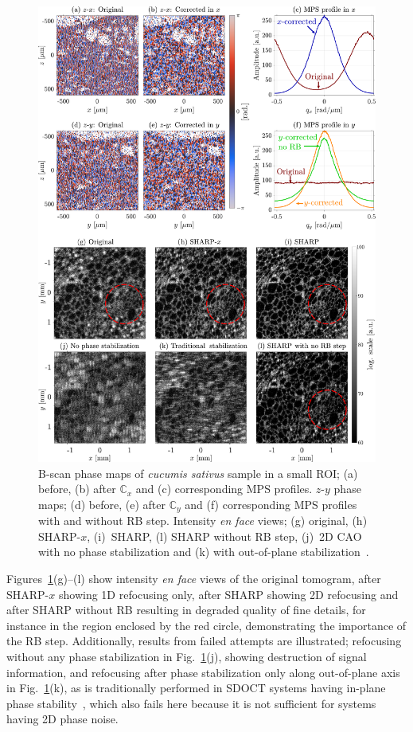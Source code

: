 \begin{figure}[htb!]
	\centering
	\includegraphics[width=.98\textwidth]{Figures/SHARP/SHARP_Cucumber.pdf}
	\caption[Proof of concept experimental validation of SHARP in a \textit{cucumis sativus} sample tomogram acquired with a SSOCT system.]{B-scan phase maps of \textit{cucumis sativus} sample in a small ROI; (a) before, (b) after $\mathbb{C}_x$ and (c) corresponding MPS profiles. $z$-$y$ phase maps; (d) before, (e) after $\mathbb{C}_y$ and (f) corresponding MPS profiles with and without RB step. Intensity \textit{en face} views; (g) original, (h) SHARP-$x$, (i)~SHARP, (l) SHARP without RB step, (j)~2D CAO with no phase stabilization and (k) with out-of-plane stabilization~\cite{Shemonski2014_Threedimensional}.}
	\label{fig:SHARP_Cucumber}
\end{figure}

Figures~\ref{fig:SHARP_Cucumber}(g)--(l) show intensity \textit{en face} views of the original tomogram, after SHARP-$x$ showing 1D refocusing only, after SHARP showing 2D refocusing and after SHARP without RB resulting in degraded quality of fine details, for instance in the region enclosed by the red circle, demonstrating the importance of the RB step. Additionally, results from failed attempts are illustrated; refocusing without any phase stabilization in Fig.~\ref{fig:SHARP_Cucumber}(j), showing destruction of signal information, and refocusing after phase stabilization only along out-of-plane axis in Fig.~\ref{fig:SHARP_Cucumber}(k), as is traditionally performed in SDOCT systems having in-plane phase stability~\cite{Shemonski2014_Threedimensional}, which also fails here because it is not sufficient for systems having 2D phase noise.

